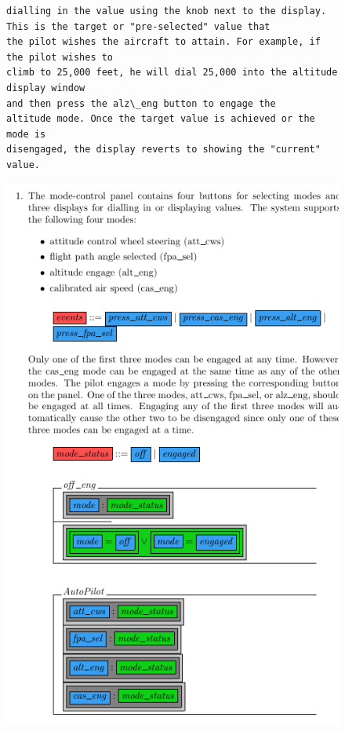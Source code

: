 \begin{figure}[H]
\begin{minipage}{0.45\textwidth}
\begin{tiny}
\begin{BVerbatim}[commandchars=+\[\]]
dialling in the value using the knob next to the display. This is the target or "pre-selected" value that
the pilot wishes the aircraft to attain. For example, if the pilot wishes to 
climb to 25,000 feet, he will dial 25,000 into the altitude display window
and then press the alz\_eng button to engage the 
altitude mode. Once the target value is achieved or the mode is
disengaged, the display reverts to showing the "current" value.       
 \end{BVerbatim}
 \end{tiny}
 \end{minipage}\hfill
 \begin{minipage}{0.45\textwidth}
 \centering
 \includegraphics[width=\linewidth]{Figures/fullexample/semiform1a.png}

\end{minipage}
\end{figure}
